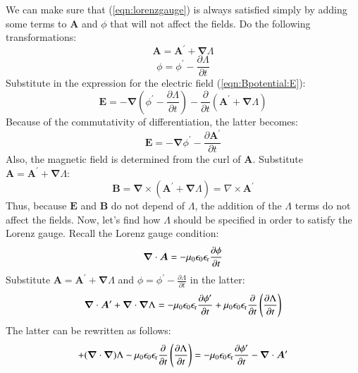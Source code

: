 \documentclass{warpdoc}
\renewcommand{\vec}[1]{\bm{#1}}
\begin{document}
We can make sure that (\ref{eqn:lorenzgauge}) is always satisfied simply by adding some terms to $\vec{A}$ and $\phi$ that will not affect the fields. Do the following transformations:
%
\begin{equation}
  \vec{A}=\vec{A}^\prime + \vec{\nabla} \Lambda
\end{equation}
%
%
\begin{equation}
  \phi=\phi^\prime - \frac{\partial\Lambda}{\partial t}
\end{equation}
%
Substitute in the expression for the electric field (\ref{eqn:Bpotential:E}):
%
\begin{equation}
\vec{E}=  -\vec{\nabla} \left( \phi^\prime - \frac{\partial\Lambda}{\partial t}\right) -\frac{\partial }{\partial t}\left( \vec{A}^\prime + \vec{\nabla} \Lambda \right) 
\end{equation}
%
Because of the commutativity of differentiation, the latter becomes:
%
\begin{equation}
\vec{E}=  -\vec{\nabla} \phi^\prime  -\frac{\partial \vec{A}^\prime}{\partial t}
\end{equation}
%
Also, the magnetic field is determined from the curl of $\vec{A}$. Substitute $\vec{A}=\vec{A}^\prime + \vec{\nabla} \Lambda$:
%
\begin{equation}
\vec{B}=\vec{\nabla} \times \left( \vec{A}^\prime + \vec{\nabla} \Lambda\right)=\nabla \times  \vec{A}^\prime
\end{equation}
%
Thus, because $\vec{E}$ and $\vec{B}$ do not depend of $\Lambda$, the addition of the $\Lambda$ terms do not affect the fields. Now, let's find how $\Lambda$ should be specified in order to satisfy the Lorenz gauge. Recall the Lorenz gauge condition:
%
\begin{equation}
\vec{\nabla}\cdot\vec{A}=-\mu_0\epsilon_0\epsilon_{\rm r}  \frac{\partial \phi}{\partial t}
\end{equation}
%
Substitute $\vec{A}=\vec{A}^\prime + \vec{\nabla} \Lambda$ and $\phi=\phi^\prime - \frac{\partial\Lambda}{\partial t}$ in the latter:
%
\begin{equation}
  \vec{\nabla}\cdot\vec{A}^\prime 
+ \vec{\nabla}\cdot \vec{\nabla} \Lambda
=
-\mu_0\epsilon_0 \epsilon_{\rm r} \frac{\partial \phi^\prime}{\partial t}
+\mu_0\epsilon_0 \epsilon_{\rm r} \frac{\partial }{\partial t} \left( \frac{\partial\Lambda}{\partial t} \right)
\end{equation}
%
The latter can be rewritten as follows:
%
\begin{equation}
+ (\vec{\nabla}\cdot \vec{\nabla}) \Lambda
- \mu_0\epsilon_0 \epsilon_{\rm r} \frac{\partial }{\partial t} \left( \frac{\partial\Lambda}{\partial t} \right)
=
-\mu_0\epsilon_0 \epsilon_{\rm r} \frac{\partial \phi^\prime}{\partial t}
-\vec{\nabla}\cdot\vec{A}^\prime 
\end{equation}
\end{document}
